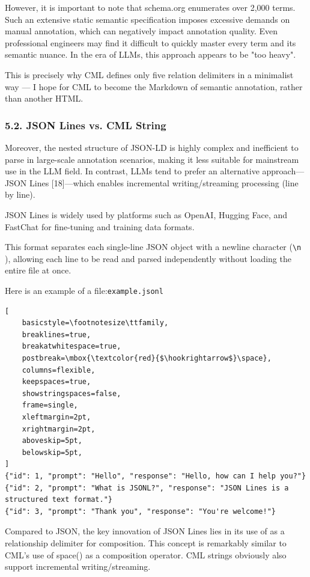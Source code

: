 \documentclass[conference]{IEEEtran}
\begin{document}
However, it is important to note that schema.org enumerates over 2,000
terms. Such an extensive static semantic specification imposes excessive
demands on manual annotation, which can negatively impact annotation
quality. Even professional engineers may find it difficult to quickly
master every term and its semantic nuance. In the era of LLMs, this
approach appears to be "too heavy".

This is precisely why CML defines only five relation delimiters in a
minimalist way --- I hope for CML to become the Markdown of semantic
annotation, rather than another HTML.

\subsubsection{5.2. JSON Lines vs. CML
String}\label{52-json-lines-vs-cml-string}

Moreover, the nested structure of JSON-LD is highly complex and
inefficient to parse in large-scale annotation scenarios, making it less
suitable for mainstream use in the LLM field. In contrast, LLMs tend to
prefer an alternative approach---JSON Lines {[}18{]}---which enables
incremental writing/streaming processing (line by line).

JSON Lines is widely used by platforms such as OpenAI, Hugging Face, and
FastChat for fine-tuning and training data formats.

This format separates each single-line JSON object with a newline
character (\texttt{\textbackslash{}n} ), allowing each line to be read
and parsed independently without loading the entire file at once.

Here is an example of a file:\texttt{example.jsonl}

\begin{lstlisting}[
    basicstyle=\footnotesize\ttfamily,
    breaklines=true,
    breakatwhitespace=true,
    postbreak=\mbox{\textcolor{red}{$\hookrightarrow$}\space},
    columns=flexible,
    keepspaces=true,
    showstringspaces=false,
    frame=single,
    xleftmargin=2pt,
    xrightmargin=2pt,
    aboveskip=5pt,
    belowskip=5pt,
]
{"id": 1, "prompt": "Hello", "response": "Hello, how can I help you?"}
{"id": 2, "prompt": "What is JSONL?", "response": "JSON Lines is a structured text format."}
{"id": 3, "prompt": "Thank you", "response": "You're welcome!"}
\end{lstlisting}


Compared to JSON, the key innovation of JSON Lines lies in its use of as
a relationship delimiter for composition. This concept is remarkably
similar to CML's use of space(\texttt{}) as a composition operator.
CML strings obviously also support incremental writing/streaming.
\end{document}

